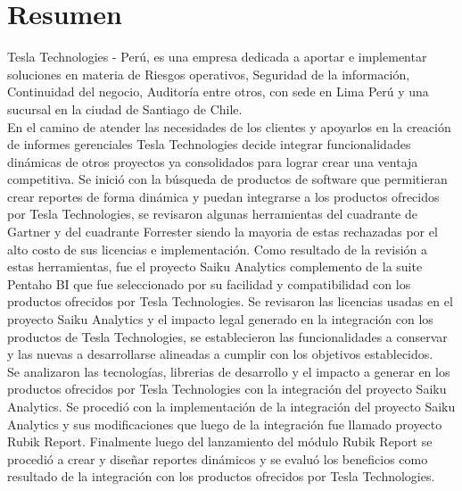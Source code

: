 \chapter*{Resumen}
\begin{paragraph}
\singlespacing	
Tesla Technologies - Perú, es una empresa dedicada a aportar e implementar soluciones en materia de Riesgos operativos, Seguridad de la información, Continuidad del negocio, Auditoría entre otros, con sede en Lima Perú y una sucursal en la ciudad de Santiago de Chile.\\

\onehalfspacing
En el camino de atender las necesidades de los clientes y apoyarlos en la creación de informes gerenciales Tesla Technologies decide integrar funcionalidades dinámicas de otros proyectos ya consolidados para lograr crear una ventaja competitiva.
Se inició con la búsqueda de productos de software que permitieran crear reportes de forma dinámica y puedan integrarse a los productos ofrecidos por Tesla Technologies, se revisaron algunas herramientas del cuadrante de Gartner y del cuadrante Forrester siendo la mayoria de estas rechazadas por el alto costo de sus licencias e implementación. 
Como resultado de la revisión a estas herramientas, fue el proyecto Saiku Analytics complemento de la suite Pentaho BI  que fue seleccionado por su facilidad y compatibilidad con los productos ofrecidos por Tesla Technologies.
Se revisaron las licencias usadas en el proyecto Saiku Analytics y el impacto legal generado en la integración con los productos de Tesla Technologies, se establecieron las funcionalidades a conservar y las nuevas a desarrollarse alineadas a cumplir con los objetivos establecidos.
\\
\doublespacing
Se analizaron las tecnologías, librerias de desarrollo y el impacto a generar en los productos ofrecidos por Tesla Technologies con la integración del proyecto Saiku Analytics.
Se procedió con la implementación de la integración del proyecto Saiku Analytics y sus modificaciones que luego de la integración fue llamado proyecto Rubik Report.
Finalmente luego del lanzamiento del módulo Rubik Report se procedió a crear y diseñar reportes dinámicos y se evaluó los beneficios como resultado de la integración con los productos ofrecidos por Tesla Technologies.
\end{paragraph}
